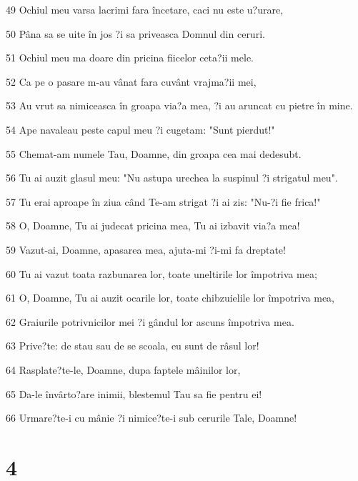 \par 49 Ochiul meu varsa lacrimi fara încetare, caci nu este u?urare,
\par 50 Pâna sa se uite în jos ?i sa priveasca Domnul din ceruri.
\par 51 Ochiul meu ma doare din pricina fiicelor ceta?ii mele.
\par 52 Ca pe o pasare m-au vânat fara cuvânt vrajma?ii mei,
\par 53 Au vrut sa nimiceasca în groapa via?a mea, ?i au aruncat cu pietre în mine.
\par 54 Ape navaleau peste capul meu ?i cugetam: "Sunt pierdut!"
\par 55 Chemat-am numele Tau, Doamne, din groapa cea mai dedesubt.
\par 56 Tu ai auzit glasul meu: "Nu astupa urechea la suspinul ?i strigatul meu".
\par 57 Tu erai aproape în ziua când Te-am strigat ?i ai zis: "Nu-?i fie frica!"
\par 58 O, Doamne, Tu ai judecat pricina mea, Tu ai izbavit via?a mea!
\par 59 Vazut-ai, Doamne, apasarea mea, ajuta-mi ?i-mi fa dreptate!
\par 60 Tu ai vazut toata razbunarea lor, toate uneltirile lor împotriva mea;
\par 61 O, Doamne, Tu ai auzit ocarile lor, toate chibzuielile lor împotriva mea,
\par 62 Graiurile potrivnicilor mei ?i gândul lor ascuns împotriva mea.
\par 63 Prive?te: de stau sau de se scoala, eu sunt de râsul lor!
\par 64 Rasplate?te-le, Doamne, dupa faptele mâinilor lor,
\par 65 Da-le învârto?are inimii, blestemul Tau sa fie pentru ei!
\par 66 Urmare?te-i cu mânie ?i nimice?te-i sub cerurile Tale, Doamne!

\chapter{4}

